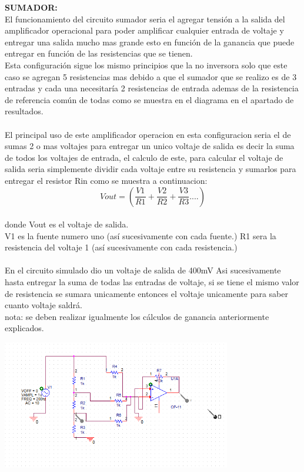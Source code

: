 \documentclass[12pt,a4paper]{article}
\begin{document}
\textbf{SUMADOR:\\}
El funcionamiento del circuito sumador seria el agregar tensión a la salida del amplificador operacional para poder amplificar cualquier entrada de voltaje y entregar una salida mucho mas grande esto en función de la ganancia que puede entregar en función de las resistencias que se tienen.\\
Esta configuración sigue los mismo principios que la no inversora solo que este caso se agregan 5 resistencias mas debido a que el sumador que se realizo es de 3 entradas y cada una necesitaría 2 resistencias de entrada ademas de la resistencia de referencia común de todas como se muestra en el diagrama en el apartado de resultados.\\\\
El principal uso de este amplificador operacion en esta configuracion seria el de sumas 2 o mas voltajes para entregar un unico voltaje de salida es decir la suma de todos los voltajes de entrada, el calculo de este, para calcular el voltaje de salida seria simplemente dividir cada voltaje entre su resistencia y sumarlos para entregar el resistor Rin como se muestra a continuacion:\\
$$Vout=(\frac{V1}{R1}+\frac{V2}{R2}+\frac{V3}{R3}....)$$\\
donde Vout es el voltaje de salida.\\
V1 es la fuente numero uno (así sucesivamente con cada fuente.)
R1 sera la resistencia del voltaje 1 (así sucesivamente con cada resistencia.)\\\\En el circuito simulado dio un voltaje de salida de 400mV
 Asi sucesivamente hasta entregar la suma de todas las entradas de voltaje, si se tiene el mismo valor de resistencia se sumara unicamente entonces el voltaje  unicamente para saber cuanto voltaje saldrá.\\nota: se deben realizar igualmente los cálculos de ganancia anteriormente explicados.\\
 
\begin{center}
\includegraphics[width=10cm]{Simulaciones/suma.png} 
\end{center}
 
\end{document}

